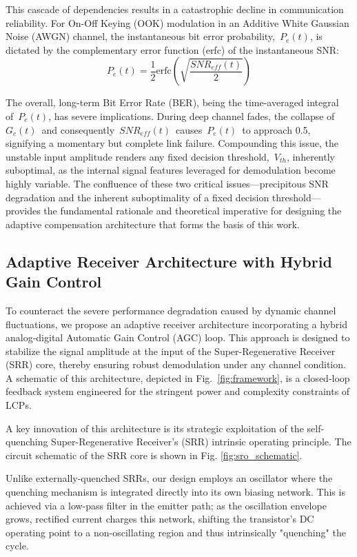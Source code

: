 \documentclass[journal]{IEEEtran}
\begin{document}
This cascade of dependencies results in a catastrophic decline in communication reliability. For On-Off Keying (OOK) modulation in an Additive White Gaussian Noise (AWGN) channel, the instantaneous bit error probability,~$P_e(t)$, is dictated by the complementary error function (erfc) of the instantaneous SNR:
\begin{equation}
    P_e(t) = \frac{1}{2}\text{erfc}\left(\sqrt{\frac{SNR_{eff}(t)}{2}}\right)
    \label{eq:Pe_t_revised}
\end{equation}

The overall, long-term Bit Error Rate (BER), being the time-averaged integral of~$P_e(t)$, has severe implications. During deep channel fades, the collapse of~$G_c(t)$~and consequently~$SNR_{eff}(t)$~causes~$P_e(t)$~to approach 0.5, signifying a momentary but complete link failure. Compounding this issue, the unstable input amplitude renders any fixed decision threshold,~$V_{th}$, inherently suboptimal, as the internal signal features leveraged for demodulation become highly variable. The confluence of these two critical issues---precipitous SNR degradation and the inherent suboptimality of a fixed decision threshold---provides the fundamental rationale and theoretical imperative for designing the adaptive compensation architecture that forms the basis of this work.

\subsection{Adaptive Receiver Architecture with Hybrid Gain Control}
\label{subsec:adaptive_architecture}
To counteract the severe performance degradation caused by dynamic channel fluctuations, we propose an adaptive receiver architecture incorporating a hybrid analog-digital Automatic Gain Control (AGC) loop. This approach is designed to stabilize the signal amplitude at the input of the Super-Regenerative Receiver (SRR) core, thereby ensuring robust demodulation under any channel condition. A schematic of this architecture, depicted in Fig.~\ref{fig:framework}, is a closed-loop feedback system engineered for the stringent power and complexity constraints of LCPs.


A key innovation of this architecture is its strategic exploitation of the self-quenching Super-Regenerative Receiver's (SRR) intrinsic operating principle.
The circuit schematic of the SRR core is shown in Fig. \ref{fig:sro_schematic}.


Unlike externally-quenched SRRs, our design employs an oscillator where the quenching mechanism is integrated directly into its own biasing network. This is achieved via a low-pass filter in the emitter path; as the oscillation envelope grows, rectified current charges this network, shifting the transistor's DC operating point to a non-oscillating region and thus intrinsically "quenching" the cycle.
\end{document}
